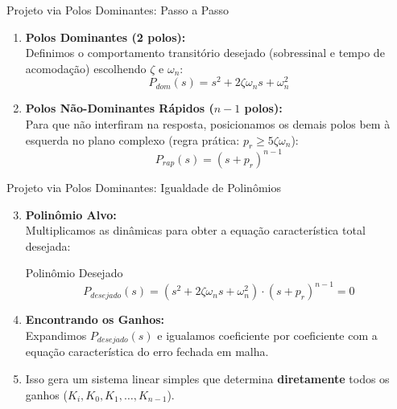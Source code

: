 \documentclass[11pt, aspectratio=169]{beamer}
\begin{document}
\begin{frame}{Projeto via Polos Dominantes: Passo a Passo}
    \begin{enumerate}
        \item \textbf{Polos Dominantes (2 polos):}\\
        Definimos o comportamento transitório desejado (sobressinal e tempo de acomodação) escolhendo $\zeta$ e $\omega_n$:
        \[ P_{dom}(s) = s^2 + 2\zeta\omega_n s + \omega_n^2 \]
        
        \vspace{0.3cm}
        
        \item \textbf{Polos Não-Dominantes Rápidos ($n-1$ polos):}\\
        Para que não interfiram na resposta, posicionamos os demais polos bem à esquerda no plano complexo (regra prática: $p_r \ge 5\zeta\omega_n$):
        \[ P_{rap}(s) = (s + p_r)^{n-1} \]
    \end{enumerate}
\end{frame}

\begin{frame}{Projeto via Polos Dominantes: Igualdade de Polinômios}
    \begin{enumerate}
        \setcounter{enumi}{2}
        \item \textbf{Polinômio Alvo:}\\
        Multiplicamos as dinâmicas para obter a equação característica total desejada:
        \begin{alertblock}{Polinômio Desejado}
            \[ P_{desejado}(s) = (s^2 + 2\zeta\omega_n s + \omega_n^2) \cdot (s + p_r)^{n-1} = 0 \]
        \end{alertblock}
        
        \vspace{0.2cm}
        
        \item \textbf{Encontrando os Ganhos:}\\
        Expandimos $P_{desejado}(s)$ e igualamos coeficiente por coeficiente com a equação característica do erro fechada em malha.
        \item Isso gera um sistema linear simples que determina \textbf{diretamente} todos os ganhos ($K_i, K_0, K_1, \dots, K_{n-1}$).
    \end{enumerate}
\end{frame}
\end{document}
